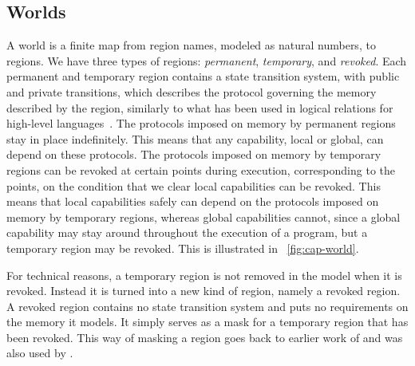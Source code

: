 \documentclass[compsoc,conference,letterpaper,fleqn]{IEEEtran}
\newcommand\lau[1]{{\color{purple} \sf \footnotesize {LS: #1}}\\}
\newcommand\dominique[1]{{\color{purple} \sf \footnotesize {DD: #1}}\\}
\newcommand{\plainview}[1]{\mathrm{#1}}
\newcommand{\perma}{\plainview{perm}}
\newcommand{\temp}{\plainview{temp}}
\newcommand{\revoked}{\plainview{revoked}}
\begin{document}
\subsection{Worlds}
A world is a finite map from region names, modeled as natural numbers, to regions.
We have three types of regions: \emph{permanent}, \emph{temporary}, and \emph{revoked}.
Each permanent and temporary region contains a state transition system, with
public and private transitions, which describes the protocol governing
the memory described by the region, similarly to what
has been used in logical relations for high-level
languages~\cite{Ahmed:popl09,Dreyer:jfp12,Devriese:2016ObjCap}. 
The protocols imposed on memory by permanent regions stay in place
indefinitely. This means that any capability, local or global, can
depend on these protocols. The protocols imposed on memory by temporary
regions can be revoked at certain points during execution,
corresponding to the points, on the condition that we clear local capabilities can be
revoked. This means that local capabilities safely can depend on the
protocols imposed on memory by temporary regions, whereas global
capabilities cannot, since a global capability may stay around
throughout the execution of a program, but a temporary region may be
revoked. This is illustrated in \figurename~\ref{fig:cap-world}.

For technical reasons, a temporary region is not removed in the model when it is
revoked. Instead it is turned into a new kind of region, namely a revoked
region. A revoked region contains no state transition system and puts no
requirements on the memory it models. It simply serves as a mask for a
temporary region that has been revoked. This way of masking a region goes back
to earlier work of \citet{Ahmed2004semantics} and was also used
by \citet{Thamsborg:2011:KLR:2034773.2034831}.

\end{document}
